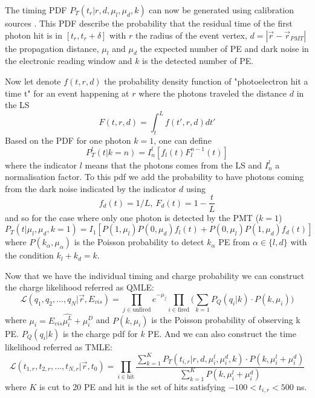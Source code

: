 The timing PDF $P_T(t_r | r,d,\mu_l,\mu_d,k)$ can now be generated using calibration sources \cite{huang_data-driven_2023}. This PDF describe the probability that the residual time of the first photon hit is in $[t_r, t_r + \delta]$ with $r$ the radius of the event vertex, $d = |\vec{r} - \vec{r}_{PMT}|$ the propagation distance, $\mu_l$ and $\mu_d$ the expected number of PE and dark noise in the electronic reading window and $k$ is the detected number of PE.

Now let denote $f(t, r, d)$ the probability density function of "photoelectron hit a time t" for an event happening at $r$ where the photons traveled the distance $d$ in the LS
\begin{equation}
  F(t, r, d) = \int_t^L f(t', r, d)dt'
\end{equation}
Based on the PDF for one photon $k=1$, one can define
\begin{equation}
  P^l_T(t|k=n) = I^l_n [f_l(t)F^{n-1}_l(t)]
\end{equation}
where the indicator $l$ means that the photons comes from the LS and $I^l_n$ a normalisation factor. To this pdf we add the probability to have photons coming from the dark noise indicated by the indicator $d$ using
\begin{equation}
  f_d(t) = 1 / L, ~ F_d(t) = 1 - \frac{t}{L}
\end{equation}
and so for the case where only one photon is detected by the PMT ($k=1$)
\begin{equation}
  P_T(t|\mu_l, \mu_d, k = 1) = I_1 [ P(1, \mu_l) P(0, \mu_d) f_l(t) + P(0, \mu_l) P(1, \mu_d) f_d(t) ]
\end{equation}
where $P(k_\alpha, \mu_\alpha)$ is the Poisson probability to detect $k_\alpha$ PE from $\alpha \in \{l, d\}$ with the condition $k_l + k_d = k$.

Now that we have the individual timing and charge probability we can construct the charge likelihood referred as QMLE:
\begin{equation}
  \mathcal{L}(q_1, q_2, ..., q_N | \vec{r}, E_{vis}) = \prod_{j \in \mathrm{unfired}} e^{-\mu_j} \prod_{i \in \mathrm{fired}} \bigg(\sum_{k=1} P_Q(q_i|k) \cdot P(k, \mu_i) \bigg)
\end{equation}
where $\mu_i = E_{vis} \hat{\mu_i^L} + \mu_i^D$ and $P(k, \mu_i)$ is the Poisson probability of observing k PE. $P_Q(q_i|k)$ is the charge pdf for $k$ PE. And we can also construct the time likelihood referred as TMLE:
\begin{equation}
  \mathcal{L}(t_{1,r}, t_{2,r}, ..., t_{N,r} | \vec{r}, t_0) = \prod_{i \in \mathrm{hit}} \frac{\sum_{k=1}^K P_T(t_{i,r} | r, d, \mu_i^l, \mu_i^d, k) \cdot P(k, \mu^l_i + \mu^d_i)}{\sum_{k=1}^K P(k, \mu^l_i + \mu^d_i)}
\end{equation}
where $K$ is cut to 20 PE and hit is the set of hits satisfying $-100 < t_{i,r} < 500$ ns.

